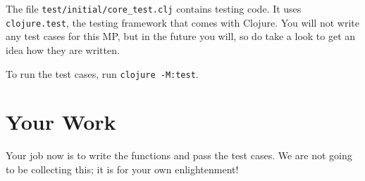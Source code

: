 \documentclass[12pt]{article}
\def\clojure{{\mysc Clojure}}
\begin{document}
The file \texttt{test/initial/core\_test.clj} contains testing code.
It uses \texttt{clojure.test}, the testing framework that comes with \clojure.  You will not
write any test cases for this MP, but in the future you will, so
do take a look to get an idea how they are written.

To run the test cases, run \texttt{clojure -M:test}.

\section{Your Work}

Your job now is to write the functions and pass the test cases.
We are not going to be collecting this; it is for your own enlightenment!
\end{document}
